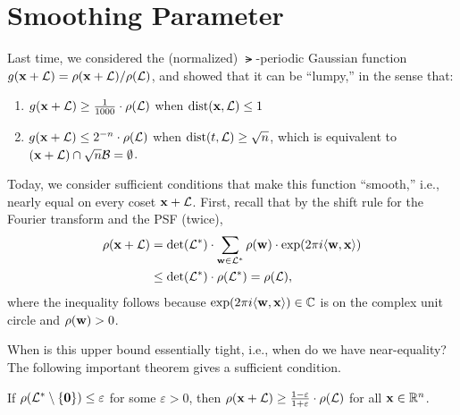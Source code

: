 \documentclass[11pt]{article}
\begin{document}
\section{Smoothing Parameter}
\label{sec:smoothing-parameter}

Last time, we considered the (normalized) $\lat$-periodic Gaussian
function $g(\mathbf{x}+\mathcal{L}) = \rho(\mathbf{x}+\mathcal{L})/\rho(\mathcal{L})$, and showed
that it can be ``lumpy,'' in the sense that:
\begin{enumerate}
\item $g(\mathbf{x}+\mathcal{L}) \geq \frac{1}{1000} \cdot \rho(\mathcal{L})$ when
  $\operatorname{dist}(\mathbf{x},\mathcal{L}) \leq 1$
\item $g(\mathbf{x}+\mathcal{L}) \leq 2^{-n} \cdot \rho(\mathcal{L})$ when
  $\operatorname{dist}(t,\mathcal{L}) \geq \sqrt{n}$, which is equivalent to
  $(\mathbf{x}+\mathcal{L}) \cap \sqrt{n} \mathcal{B} = \emptyset$.
\end{enumerate}

Today, we consider sufficient conditions that make this function
``smooth,'' i.e., nearly equal on every coset $\mathbf{x}+\mathcal{L}$. First,
recall that by the shift rule for the Fourier transform and the PSF
(twice),
\begin{align}
  \rho(\mathbf{x}+\mathcal{L}) 
  &= \det(\mathcal{L}^*) \cdot \sum_{\mathbf{w} \in
    \mathcal{L}^*} \rho(\mathbf{w}) \cdot \exp(2\pi i \langle\mathbf{w},\mathbf{x}\rangle)
    \label{eq:rho-coset} \\
  &\leq \det(\mathcal{L}^*) \cdot \rho(\mathcal{L}^{*}) = \rho(\mathcal{L}), \nonumber
\end{align}  
where the inequality follows because
$\exp(2\pi i \langle\mathbf{w},\mathbf{x}\rangle) \in \mathbb{C}$ is on the complex unit
circle and $\rho(\mathbf{w}) > 0$.

When is this upper bound essentially tight, i.e., when do we have
near-equality? The following important theorem gives a sufficient
condition.

\begin{theorem}
  \label{thm:smooth}
  If $\rho(\mathcal{L}^* \setminus \{\mathbf{0}\}) \leq \varepsilon$ for some
  $\varepsilon > 0$, then
  $\rho(\mathbf{x} + \mathcal{L}) \geq \frac{1-\varepsilon}{1+\varepsilon} \cdot
  \rho(\mathcal{L})$ for all $\mathbf{x} \in \mathbb{R}^{n}$.
\end{theorem}
\end{document}
